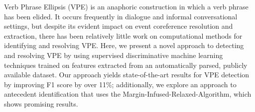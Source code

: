 Verb Phrase Ellipsis (VPE) is an anaphoric construction in which a verb phrase has been elided. It occurs frequently in dialogue and informal conversational settings, but despite its evident impact on event coreference resolution and extraction, there has been relatively little work on computational methods for identifying and resolving VPE. Here, we present a novel approach to detecting and resolving VPE by using supervised discriminative machine learning techniques trained on features extracted from an automatically parsed, publicly available dataset. Our approach yields state-of-the-art results for VPE detection by improving F1 score by over 11\%; additionally, we explore an approach to antecedent identification that uses the Margin-Infused-Relaxed-Algorithm, which shows promising results.

